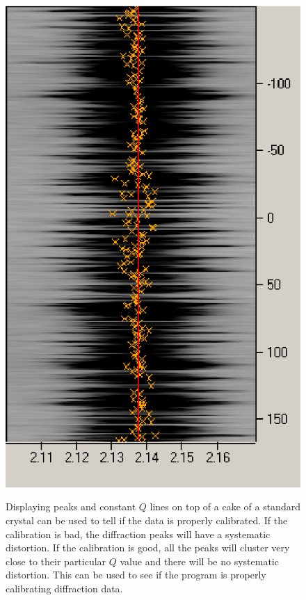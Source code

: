\begin{figure}[htb]
{    \includegraphics[scale=.75]{figures/good_calibration_cake_zoom_peaks.eps}}		
    \caption{Displaying peaks and constant $Q$ lines on top of a 
    cake of a standard crystal can be used to tell if the data is properly 
    calibrated. If the calibration is bad, the diffraction peaks will have 
    a systematic distortion. If the calibration is good, all the peaks will 
    cluster very close to their particular $Q$ value and there will be no 
    systematic distortion. This can be used to see if the program is properly 
    calibrating diffraction data.}
    \label{calibration_cake_zoom}
\end{figure}

